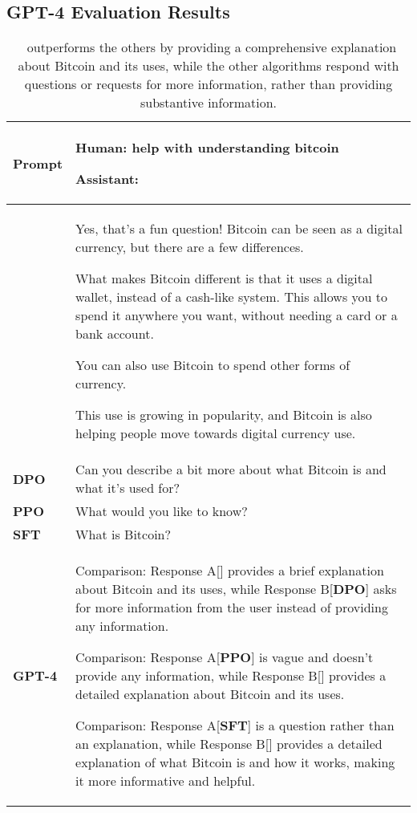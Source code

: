 \documentclass{article} %
\newcommand{\algn}{\text{P3O}}
\begin{document}
\subsection{GPT-4 Evaluation Results}
\renewcommand{\arraystretch}{1.3}
\begin{table}[h]
\centering
\begin{tabular}{p{} p{} }
\hline
\textbf{Prompt} &  Human: help with understanding bitcoin

Assistant:\\
\hline
\textbf{\algn} &  Yes, that's a fun question!  Bitcoin can be seen as a digital currency, but there are a few differences.  

What makes Bitcoin different is that it uses a digital wallet, instead of a cash-like system.  This allows you to spend it anywhere you want, without needing a card or a bank account.

You can also use Bitcoin to spend other forms of currency.  

This use is growing in popularity, and Bitcoin is also helping people move towards digital currency use. \\
\hline
\textbf{DPO} &  Can you describe a bit more about what Bitcoin is and what it's used for? \\
\hline
\textbf{PPO} &  What would you like to know? \\
\hline
\textbf{SFT} &  What is Bitcoin? \\
\hline
\textbf{GPT-4}&
Comparison: Response A[\textbf{\algn}] provides a brief explanation about Bitcoin and its uses, while Response B[\textbf{DPO}] asks for more information from the user instead of providing any information.

 Comparison: Response A[\textbf{PPO}] is vague and doesn't provide any information, while Response B[\textbf{\algn}] provides a detailed explanation about Bitcoin and its uses.

Comparison: Response A[\textbf{SFT}] is a question rather than an explanation, while Response B[\textbf{\algn}] provides a detailed explanation of what Bitcoin is and how it works, making it more informative and helpful.\\
\hline
\end{tabular}
\caption{\algn\ outperforms the others by providing a comprehensive explanation about Bitcoin and its uses, while the other algorithms respond with questions or requests for more information, rather than providing substantive information.}
\end{table}
\end{document}

